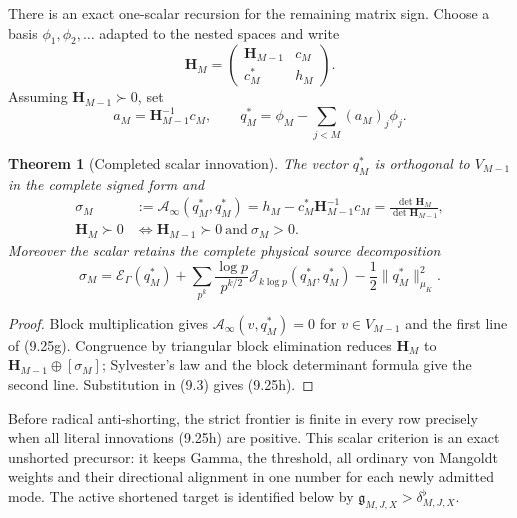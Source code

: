 \documentclass[11pt]{amsart}
\newtheorem{theorem}{Theorem}[section]
\theoremstyle{definition}
\theoremstyle{remark}
\begin{document}
There is an exact one-scalar recursion for the remaining matrix sign.
Choose a basis \(\phi_1,\phi_2,\ldots\) adapted to the nested spaces and
write
\[
 \mathbf H_M=
 \begin{pmatrix}\mathbf H_{M-1}&c_M\\c_M^*&h_M\end{pmatrix}.
\tag{9.25e}
\]
Assuming \(\mathbf H_{M-1}\succ0\), set
\[
 a_M=\mathbf H_{M-1}^{-1}c_M,
 \qquad
 q_M^*=\phi_M-\sum_{j<M}(a_M)_j\phi_j.
\tag{9.25f}
\]

\begin{theorem}[Completed scalar innovation]
\label{thm:scalar-innovation}
The vector \(q_M^*\) is orthogonal to \(V_{M-1}\) in the complete signed
form and
\[
\boxed{
 \begin{aligned}
 \sigma_M
 &:={\mathcal A}_\infty(q_M^*,q_M^*)
 =h_M-c_M^*\mathbf H_{M-1}^{-1}c_M
 =\frac{\det\mathbf H_M}{\det\mathbf H_{M-1}},\\
 \mathbf H_M\succ0
 &\Longleftrightarrow
 \mathbf H_{M-1}\succ0\ \text{and}\ \sigma_M>0.
 \end{aligned}}
\tag{9.25g}
\]
Moreover the scalar retains the complete physical source decomposition
\[
 \boxed{
 \sigma_M=\mathscr E_\Gamma(q_M^*)
 +\sum_{p^k}\frac{\log p}{p^{k/2}}
       \mathcal J_{k\log p}(q_M^*,q_M^*)
 -\frac12\lVert q_M^*\rVert_{\mu_K}^2.}
\tag{9.25h}
\]
\end{theorem}

\begin{proof}
Block multiplication gives
\({\mathcal A}_\infty(v,q_M^*)=0\) for \(v\in V_{M-1}\) and the first
line of (9.25g).  Congruence by triangular block elimination reduces
\(\mathbf H_M\) to \(\mathbf H_{M-1}\oplus[\sigma_M]\); Sylvester's law
and the block determinant formula give the second line.  Substitution in
(9.3) gives (9.25h).
\end{proof}

Before radical anti-shorting, the strict frontier is finite in every row
precisely when all literal innovations (9.25h) are positive.  This scalar
criterion is an exact unshorted precursor: it keeps Gamma, the threshold,
all ordinary von Mangoldt weights and their directional alignment in one
number for each newly admitted mode.  The active shortened target is
identified below by \(\mathfrak g_{M,J,X}>\delta^{\flat}_{M,J,X}\).
\end{document}
